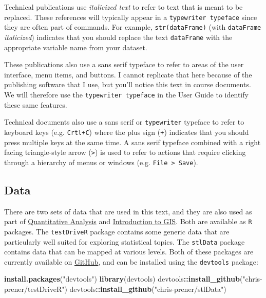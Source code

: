 \documentclass[]{book}
\newenvironment{Shaded}{\begin{snugshade}}{\end{snugshade}}
\newcommand{\KeywordTok}[1]{\textcolor[rgb]{0.13,0.29,0.53}{\textbf{#1}}}
\newcommand{\StringTok}[1]{\textcolor[rgb]{0.31,0.60,0.02}{#1}}
\newcommand{\OperatorTok}[1]{\textcolor[rgb]{0.81,0.36,0.00}{\textbf{#1}}}
\newcommand{\NormalTok}[1]{#1}
\theoremstyle{definition}
\theoremstyle{definition}
\theoremstyle{definition}
\theoremstyle{remark}
\begin{document}
Technical publications use \emph{italicized text} to refer to text that
is meant to be replaced. These references will typically appear in a
\texttt{typewriter\ typeface} since they are often part of commands. For
example, \texttt{str(dataFrame)} (with \texttt{dataFrame}
\emph{italicized}) indicates that you should replace the text
\texttt{dataFrame} with the appropriate variable name from your dataset.

These publications also use a sans serif typeface to refer to areas of
the user interface, menu items, and buttons. I cannot replicate that
here because of the publishing software that I use, but you'll notice
this text in course documents. We will therefore use the
\texttt{typewriter\ typeface} in the User Guide to identify these same
features.

Technical documents also use a sans serif or \texttt{typewriter}
typeface to refer to keyboard keys (e.g. \texttt{Crtl+C}) where the plus
sign (\texttt{+}) indicates that you should press multiple keys at the
same time. A sans serif typeface combined with a right facing
triangle-style arrow (\texttt{\textgreater{}}) is used to refer to
actions that require clicking through a hierarchy of menus or windows
(e.g. \texttt{File\ \textgreater{}\ Save}).

\subsection{Data}\label{data}

There are two sets of data that are used in this text, and they are also
used as part of \href{https://slu-soc5050.github.io}{Quantitative
Analysis} and \href{https://slu-soc5650.github.io}{Introduction to GIS}.
Both are available as \texttt{R} packages. The \texttt{testDriveR}
package contains some generic data that are particularly well suited for
exploring statistical topics. The \texttt{stlData} package contains data
that can be mapped at various levels. Both of these packages are
currently available on \href{https://github.com}{GitHub}, and can be
installed using the \texttt{devtools} package:

\begin{Shaded}
\begin{Highlighting}[]
\KeywordTok{install.packages}\NormalTok{(}\StringTok{"devtools"}\NormalTok{)}
\KeywordTok{library}\NormalTok{(devtools)}
\NormalTok{devtools}\OperatorTok{::}\KeywordTok{install_github}\NormalTok{(}\StringTok{"chris-prener/testDriveR"}\NormalTok{)}
\NormalTok{devtools}\OperatorTok{::}\KeywordTok{install_github}\NormalTok{(}\StringTok{"chris-prener/stlData"}\NormalTok{)}
\end{Highlighting}
\end{Shaded}
\end{document}
